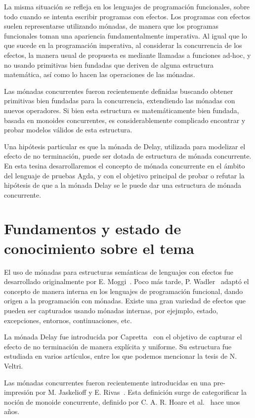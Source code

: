 \documentclass[11pt,a4paper]{article}
\begin{document}
La misma situación se refleja en los lenguajes de programación
funcionales, sobre todo cuando se intenta escribir programas con
efectos. Los programas con efectos suelen representarse utilizando
mónadas, de manera que los programas funcionales toman una apariencia
fundamentalmente imperativa. Al igual que lo que sucede en la
programación imperativa, al considerar la concurrencia de los efectos, la
manera usual de propuesta es mediante llamadas a funciones ad-hoc, y
no usando primitivas bien fundadas que deriven de alguna estructura
matemática, así como lo hacen las operaciones de las mónadas.

Las mónadas concurrentes fueron recientemente definidas buscando
obtener primitivas bien fundadas para la concurrencia, extendiendo las
mónadas con nuevos operadores. Si bien esta estructura es
matemáticamente bien fundada, basada en monoides concurrentes, es
considerablemente complicado encontrar y probar modelos válidos de
esta estructura.

Una hipótesis particular es que la mónada de Delay, utilizada para
modelizar el efecto de no terminación, puede ser dotada de estructura
de mónada concurrente. En esta tesina desarrollaremos el concepto de
mónada concurrente en el ámbito del lenguaje de pruebas Agda, y con el
objetivo principal de probar o refutar la hipótesis de que a la mónada
Delay se le puede dar una estructura de mónada concurrente.

\section{Fundamentos y estado de conocimiento sobre el tema}

El uso de mónadas para estructuras semánticas de lenguajes con efectos
fue desarrollado originalmente por E. Moggi~\cite{Mog:CLM,
  Mog:NCM}. Poco más tarde, P. Wadler~\cite{Wad:EFP} adaptó el
concepto de manera interna en los lenguajes de programación funcional,
dando origen a la programación con mónadas. Existe una gran variedad
de efectos que pueden ser capturados usando mónadas internas, por
ejejmplo, estado, excepciones, entornos, continuaciones, etc.

La mónada Delay fue introducida por Capretta~\cite{Cap:GRCT} con el
objetivo de capturar el efecto de no terminación de manera explícita y
uniforme. Su estructura fue estudiada en varios artículos, entre los
que podemos mencionar la tesis de N. Veltri.

Las mónadas concurrentes fueron recientemente introducidas en una
pre-impresión por M. Jaskelioff y E. Rivas~\cite{RJ:MM}. Esta
definición surge de categorificar la noción de monoide concurrente,
definido por C. A. R. Hoare et al.~\cite{HHMOHPS:concmonoid} hace unos
años.
\end{document}
